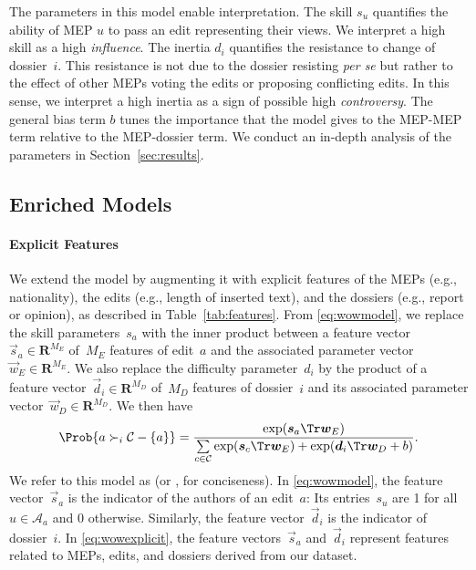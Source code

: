 The parameters in this model enable interpretation.
The skill $s_u$ quantifies the ability of MEP $u$ to pass an edit representing their views.
We interpret a high skill as a high \textit{influence}.
The inertia $d_i$ quantifies the resistance to change of dossier~$i$.
This resistance is not due to the dossier resisting \textit{per se} but rather to the effect of other MEPs voting the edits or proposing conflicting edits.
In this sense, we interpret a high inertia as a sign of possible high \textit{controversy}.
The general bias term $b$ tunes the importance that the model gives to the MEP-MEP term relative to the MEP-dossier term.
We conduct an in-depth analysis of the parameters in Section~\ref{sec:results}.


\subsection{Enriched Models}
\label{sec:enriched}

\paragraph{Explicit Features}

We extend the \wow{} model by augmenting it with explicit features of the MEPs (e.g., nationality), the edits (e.g., length of inserted text), and the dossiers (e.g., report or opinion), as described in Table~\ref{tab:features}.
From \eqref{eq:wowmodel}, we replace the skill parameters~$s_a$ with the inner product between a feature vector~$\vec{s}_a \in \mathbf{R}^{M_E}$ of~$M_E$ features of edit~$a$ and the associated parameter vector~$\vec{w}_E \in \mathbf{R}^{M_E}$.
We also replace the difficulty parameter~$d_i$ by the product of a feature vector~$\vec{d}_i \in \mathbf{R}^{M_D}$ of~$M_D$ features of dossier~$i$ and its associated parameter vector~$\vec{w}_D \in \mathbf{R}^{M_D}$.
We then have
\begin{equation}
	\label{eq:wowexplicit}
	\Prob{ a \succ_i \mathcal{C} - \{ a\} } =
	\frac{\exp(\vec{s}_a\Tr \vec{w}_E) }{ \sum\limits_{c \in \mathcal{C} } \exp(\vec{s}_c\Tr \vec{w}_E) + \exp(\vec{d}_i \Tr \vec{w}_D + b) }.
\end{equation}
We refer to this model as  (or , for conciseness).
In \eqref{eq:wowmodel}, the feature vector~$\vec{s}_a$ is the indicator of the authors of an edit~$a$:
Its entries~$s_u$ are 1 for all~$u \in \mathcal{A}_a$ and 0 otherwise.
Similarly, the feature vector~$\vec{d}_i$ is the indicator of dossier~$i$.
In \eqref{eq:wowexplicit}, the feature vectors~$\vec{s}_a$ and~$\vec{d}_i$ represent features related to MEPs, edits, and dossiers derived from our dataset.


